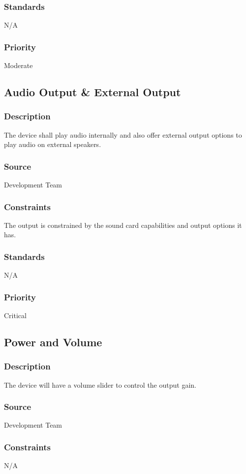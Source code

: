 \subsubsection{Standards}
N/A
\subsubsection{Priority}
Moderate

\subsection{Audio Output & External Output}
\subsubsection{Description}
The device shall play audio internally and also offer external output options to play audio on external speakers.
\subsubsection{Source}
Development Team
\subsubsection{Constraints}
The output is constrained by the sound card capabilities and output options it has.
\subsubsection{Standards}
N/A
\subsubsection{Priority}
Critical

\subsection{Power and Volume}
\subsubsection{Description}
The device will have a volume slider to control the output gain.
\subsubsection{Source}
Development Team
\subsubsection{Constraints}
N/A
